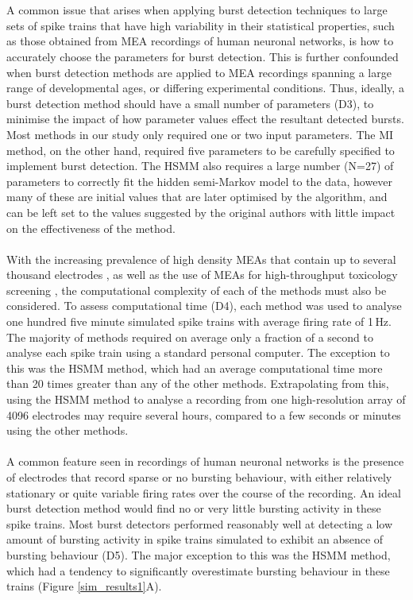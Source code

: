 \documentclass[12pt, titlepage]{article}
\begin{document}
\\ \\ A common issue that arises when applying burst detection techniques to large sets of spike trains that have high variability in their statistical properties, such as those obtained from MEA recordings of human neuronal networks, is how to accurately choose the parameters for burst detection. This is further confounded when burst detection methods are applied to MEA recordings spanning a large range of developmental ages, or differing experimental conditions. Thus, ideally, a burst detection method should have a small number of parameters (D3), to minimise the impact of how parameter values effect the resultant detected bursts. Most methods in our study only required one or two input parameters. The MI method, on the other hand, required five parameters to be carefully specified to implement burst detection. The HSMM also requires a large number (N=27) of parameters to correctly fit the hidden semi-Markov model to the data, however many of these are initial values that are later optimised by the algorithm, and can be left set to the values suggested by the original authors with little impact on the effectiveness of the method. 
\\ \\ With the increasing prevalence of high density MEAs that contain up to several thousand electrodes \cite{Maccione2014}, as well as the use of MEAs for high-throughput toxicology screening \cite{Breier2008}, the computational complexity of each of the methods must also be considered. To assess computational time (D4), each method was used to analyse one hundred five minute simulated spike trains with average firing rate of 1$\,$Hz. The majority of methods required on average only a fraction of a second to analyse each spike train using a standard personal computer. The exception to this was the HSMM method, which had an average computational time more than 20 times greater than any of the other methods. Extrapolating from this, using the HSMM method to analyse a recording from one high-resolution array of 4096 electrodes may require several hours, compared to a few seconds or minutes using the other methods.
\\ \\ A common feature seen in recordings of human neuronal networks is the presence of electrodes that record sparse or no bursting behaviour, with either relatively stationary or quite variable firing rates over the course of the recording. An ideal burst detection method would find no or very little bursting activity in these spike trains. Most burst detectors performed reasonably well at detecting a low amount of bursting activity in spike trains simulated to exhibit an absence of bursting behaviour (D5). The major exception to this was the HSMM method, which had a tendency to significantly overestimate bursting behaviour in these trains (Figure \ref{sim_results1}A).  
\end{document}
